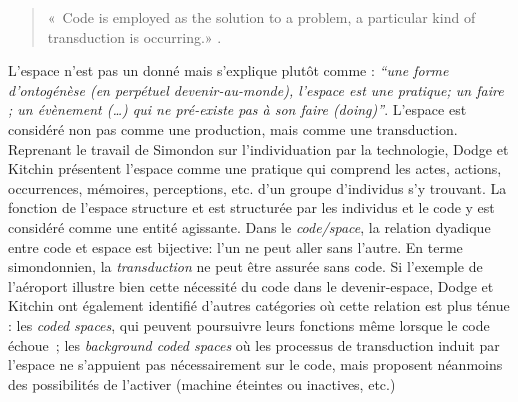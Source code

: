 \begin{quote}
« Code is employed as the solution to a problem, a particular kind of transduction 	is occurring.» \citep{Kitchin2011}. 
\end{quote}

L’espace n’est pas un donné mais s’explique plutôt comme : \textit{“une forme d’ontogénèse (en perpétuel devenir-au-monde), l’espace est une pratique; un faire ; un évènement (…) qui ne pré-existe pas à son faire (doing)”}. L’espace est considéré non pas comme une production, mais comme une transduction. Reprenant le travail de Simondon sur l’individuation par la technologie, Dodge et Kitchin présentent l’espace comme une pratique qui comprend les actes, actions, occurrences, mémoires, perceptions, etc. d’un groupe d’individus s’y trouvant. La fonction de l’espace structure et est structurée par les individus et le code y est considéré comme une entité agissante. Dans le \textit{code/space}, la relation dyadique entre code et espace est bijective: l’un ne peut aller sans l’autre. En terme simondonnien, la \textit{transduction} ne peut être assurée sans code. Si l’exemple de l’aéroport illustre bien cette nécessité du code dans le devenir-espace, Dodge et Kitchin ont également identifié d’autres catégories où cette relation est plus ténue : les \textit{coded spaces}, qui peuvent poursuivre leurs fonctions même lorsque le code échoue ; les \textit{background coded spaces} où les processus de transduction induit par l’espace ne s’appuient pas nécessairement sur le code, mais proposent néanmoins des possibilités de l’activer (machine éteintes ou inactives, etc.) 

